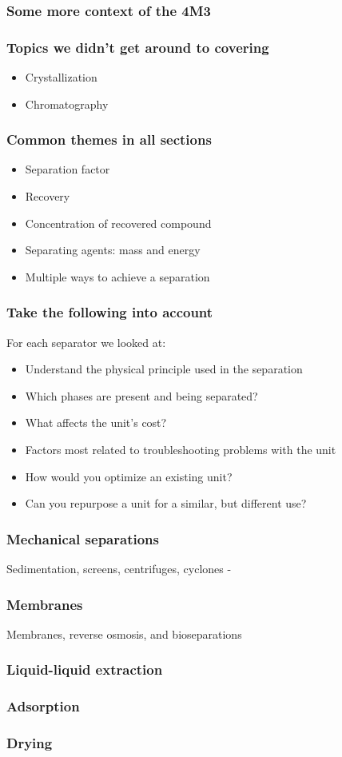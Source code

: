 \begin{frame}\frametitle{Some more context of the 4M3}
\end{frame}

\begin{frame}\frametitle{Topics we didn't get around to covering}
	\begin{itemize}
		\item	Crystallization
		\item	Chromatography
	\end{itemize}
\end{frame}

\begin{frame}\frametitle{Common themes in all sections}
	\begin{itemize}
		\item	Separation factor
		\item	Recovery
		\item	Concentration of recovered compound
		\item	Separating agents: mass and energy
		\item	Multiple ways to achieve a separation
	\end{itemize}
\end{frame}

\begin{frame}\frametitle{Take the following into account}
	For each separator we looked at:
	\begin{itemize}
		\item	Understand the physical principle used in the separation
		\item	Which phases are present and being separated?
		\item	What affects the unit's cost?
		\item	Factors most related to troubleshooting problems with the unit
		\item	How would you optimize an existing unit?
		\item	Can you repurpose a unit for a similar, but different use?
	\end{itemize}
\end{frame}

\begin{frame}\frametitle{Mechanical separations}
	Sedimentation, screens, centrifuges, cyclones - 
\end{frame}

\begin{frame}\frametitle{Membranes}
	Membranes, reverse osmosis, and bioseparations
\end{frame}

\begin{frame}\frametitle{Liquid-liquid extraction}

\end{frame}

\begin{frame}\frametitle{Adsorption}
	
\end{frame}

\begin{frame}\frametitle{Drying}
	
\end{frame}
